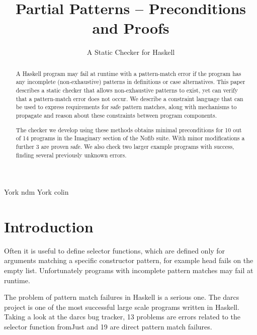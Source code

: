 \documentclass[preprint]{sigplanconf}
\newcommand{\C}[1]{\textsf{#1}}
\begin{document}
\copyrightdata{[to be supplied]}

\titlebanner{\today{} - \currenttime{}}        %
\preprintfooter{}   %

\title{Partial Patterns -- Preconditions and Proofs}
\subtitle{A Static Checker for Haskell}

           {York}
           {ndm}
           {York}
           {colin}

\maketitle

\begin{abstract}
A Haskell program may fail at runtime with a pattern-match error if the program has any incomplete (non-exhaustive) patterns in definitions or case alternatives. This paper describes a static checker that allows non-exhaustive patterns to exist, yet can verify that a pattern-match error does not occur. We describe a constraint language that can be used to express requirements for safe pattern matches, along with mechanisms to propagate and reason about these constraints between program components.

The checker we develop using these methods obtains minimal preconditions for 10 out of 14 programs in the Imaginary section of the Nofib suite\citep{nofib}. With minor modifications a further 3 are proven safe. We also check two larger example programs with success, finding several previously unknown errors.
\end{abstract}




\section{Introduction}
\label{sec:introduction}

Often it is useful to define selector functions, which are defined only for arguments matching a specific constructor pattern, for example \C{head} fails on the empty list. Unfortunately programs with incomplete pattern matches may fail at runtime.

The problem of pattern match failures in Haskell is a serious one. The darcs \citep{darcs} project is one of the most successful large scale programs written in Haskell. Taking a look at the darcs bug tracker, 13 problems are errors related to the selector function \C{fromJust} and 19 are direct pattern match failures.
\end{document}
